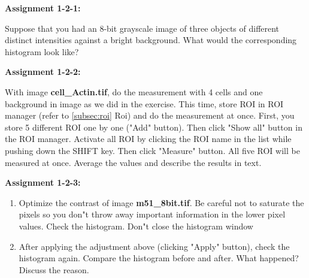 \textbf{\sffamily
Assignment 1-2-1:}

Suppose that you had an 8-bit grayscale image of three objects of
different distinct intensities against a bright background. What would
the corresponding histogram look like?

\textbf{\sffamily
Assignment 1-2-2: }

With image \textbf{cell\_Actin.tif}, do the measurement with 4 cells and one background in image as we did in the
exercise. This time, store ROI in ROI manager (refer to \ref{subsec:roi} Roi)
and do the measurement at once. First, you store 5 different ROI one by
one ("Add" button). Then click "Show all" button in the ROI manager.
Activate all ROI by clicking the ROI name in the list while pushing
down the SHIFT key. Then click "Measure"
button. All five ROI will be measured at once. Average the values and
describe the results in text.

\textbf{\sffamily
Assignment 1-2-3: }
\begin{enumerate}
\item Optimize the contrast of image
\textbf{m51\_8bit.tif}. Be careful not to
saturate the pixels so you don"t throw away important
information in the lower pixel values. Check the histogram.
Don"t close the histogram window

\item After applying the adjustment above (clicking
"Apply" button), check the histogram
again. Compare the histogram before and after. What happened? Discuss
the reason.
\end{enumerate}